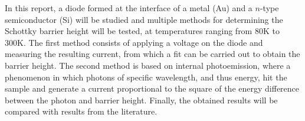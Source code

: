 In this report, a diode formed at the interface of a metal (Au) and a $n$-type semiconductor (Si) will be studied and multiple methods for determining the Schottky barrier height will be tested, at temperatures ranging from 80K to 300K. The first method consists of applying a voltage on the diode and measuring the resulting current, from which a fit can be carried out to obtain the barrier height. The second method is based on internal photoemission, where a phenomenon in which photons of specific wavelength, and thus energy, hit the sample and generate a current proportional to the square of the energy difference between the photon and barrier height. Finally, the obtained results will be compared with results from the literature.